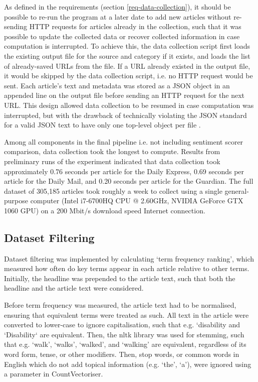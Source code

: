 \documentclass{report}
\begin{document}
As defined in the requirements (section \ref{req-data-collection}), it should be possible to re-run the program at a later date to add new articles without re-sending HTTP requests for articles already in the collection, such that it was possible to update the collected data or recover collected information in case computation is interrupted.
To achieve this, the data collection script first loads the existing output file for the source and category if it exists, and loads the list of already-saved URLs from the file.
If a URL already existed in the output file, it would be skipped by the data collection script, i.e. no HTTP request would be sent.
Each article's text and metadata was stored as a JSON object in an appended line on the output file before sending an HTTP request for the next URL.
This design allowed data collection to be resumed in case computation was interrupted, but with the drawback of technically violating the JSON standard for a valid JSON text to have only one top-level object per file \cite{rfc8259}.

Among all components in the final pipeline i.e. not including sentiment scorer comparison, data collection took the longest to compute.
Results from preliminary runs of the experiment indicated that data collection took approximately 0.76 seconds per article for the Daily Express, 0.69 seconds per article for the Daily Mail, and 0.20 seconds per article for the Guardian.
The full dataset of 305,185 articles took roughly a week to collect using a single general-purpose computer (Intel i7-6700HQ CPU @ 2.60GHz, NVIDIA GeForce GTX 1060 GPU) on a 200 Mbit/s download speed Internet connection.

\subsection{Dataset Filtering} \label{des-filtering}

Dataset filtering was implemented by calculating `term frequency ranking', which measured how often do key terms appear in each article relative to other terms.
Initially, the headline was prepended to the article text, such that both the headline and the article text were considered.

Before term frequency was measured, the article text had to be normalised, ensuring that equivalent terms were treated as such.
All text in the article were converted to lower-case to ignore capitalisation, such that e.g. `disability and `Disability` are equivalent.
Then, the nltk library \cite{Nltk} was used for stemming, such that e.g. `walk', `walks', `walked', and `walking' are equivalent, regardless of its word form, tense, or other modifiers.
Then, stop words, or common words in English which do not add topical information (e.g. `the', `a'), were ignored using a parameter in CountVectoriser.
\end{document}
